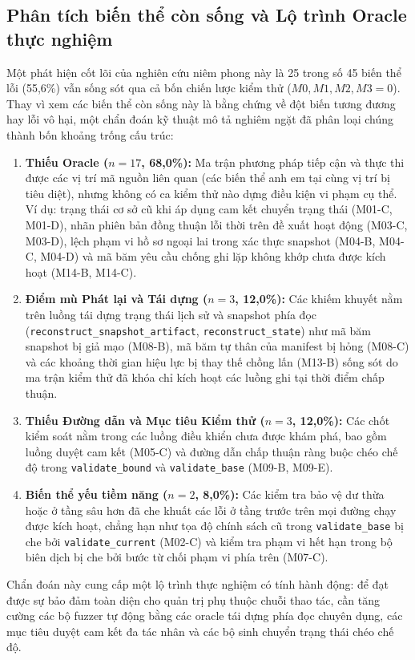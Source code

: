 \documentclass[11pt]{article}
\begin{document}
\subsection{Phân tích biến thể còn sống và Lộ trình Oracle thực nghiệm}
Một phát hiện cốt lõi của nghiên cứu niêm phong này là 25 trong số 45 biến thể lỗi (55,6\%) vẫn sống sót qua cả bốn chiến lược kiểm thử ($M0, M1, M2, M3 = 0$). Thay vì xem các biến thể còn sống này là bằng chứng về đột biến tương đương hay lỗi vô hại, một chẩn đoán kỹ thuật mô tả nghiêm ngặt đã phân loại chúng thành bốn khoảng trống cấu trúc:
\begin{enumerate}
    \item \textbf{Thiếu Oracle ($n = 17$, 68,0\%):} Ma trận phương pháp tiếp cận và thực thi được các vị trí mã nguồn liên quan (các biến thể anh em tại cùng vị trí bị tiêu diệt), nhưng không có ca kiểm thử nào dựng điều kiện vi phạm cụ thể. Ví dụ: trạng thái cơ sở cũ khi áp dụng cam kết chuyển trạng thái (M01-C, M01-D), nhãn phiên bản đồng thuận lỗi thời trên đề xuất hoạt động (M03-C, M03-D), lệch phạm vi hồ sơ ngoại lai trong xác thực snapshot (M04-B, M04-C, M04-D) và mã băm yêu cầu chống ghi lặp không khớp chưa được kích hoạt (M14-B, M14-C).
    \item \textbf{Điểm mù Phát lại và Tái dựng ($n = 3$, 12,0\%):} Các khiếm khuyết nằm trên luồng tái dựng trạng thái lịch sử và snapshot phía đọc (\texttt{reconstruct\_snapshot\_artifact}, \texttt{reconstruct\_state}) như mã băm snapshot bị giả mạo (M08-B), mã băm tự thân của manifest bị hỏng (M08-C) và các khoảng thời gian hiệu lực bị thay thế chồng lấn (M13-B) sống sót do ma trận kiểm thử đã khóa chỉ kích hoạt các luồng ghi tại thời điểm chấp thuận.
    \item \textbf{Thiếu Đường dẫn và Mục tiêu Kiểm thử ($n = 3$, 12,0\%):} Các chốt kiểm soát nằm trong các luồng điều khiển chưa được khám phá, bao gồm luồng duyệt cam kết (M05-C) và đường dẫn chấp thuận ràng buộc chéo chế độ trong \texttt{validate\_bound} và \texttt{validate\_base} (M09-B, M09-E).
    \item \textbf{Biến thể yếu tiềm năng ($n = 2$, 8,0\%):} Các kiểm tra bảo vệ dư thừa hoặc ở tầng sâu hơn đã che khuất các lỗi ở tầng trước trên mọi đường chạy được kích hoạt, chẳng hạn như tọa độ chính sách cũ trong \texttt{validate\_base} bị che bởi \texttt{validate\_current} (M02-C) và kiểm tra phạm vi hết hạn trong bộ biên dịch bị che bởi bước từ chối phạm vi phía trên (M07-C).
\end{enumerate}
Chẩn đoán này cung cấp một lộ trình thực nghiệm có tính hành động: để đạt được sự bảo đảm toàn diện cho quản trị phụ thuộc chuỗi thao tác, cần tăng cường các bộ fuzzer tự động bằng các oracle tái dựng phía đọc chuyên dụng, các mục tiêu duyệt cam kết đa tác nhân và các bộ sinh chuyển trạng thái chéo chế độ.
\end{document}
